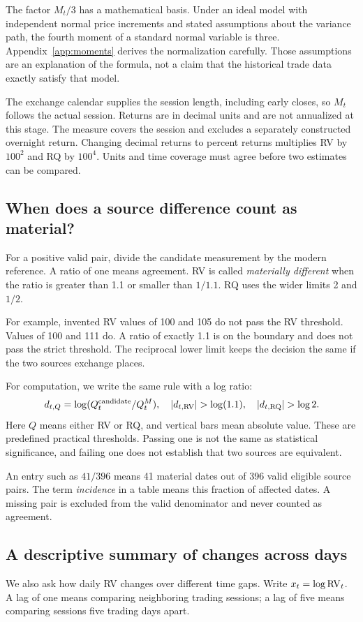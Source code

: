 The factor $M_t/3$ has a mathematical basis. Under an ideal model with independent normal price increments and stated assumptions about the variance path, the fourth moment of a standard normal variable is three. Appendix~\ref{app:moments} derives the normalization carefully. Those assumptions are an explanation of the formula, not a claim that the historical trade data exactly satisfy that model.

The exchange calendar supplies the session length, including early closes, so $M_t$ follows the actual session. Returns are in decimal units and are not annualized at this stage. The measure covers the session and excludes a separately constructed overnight return. Changing decimal returns to percent returns multiplies RV by $100^2$ and RQ by $100^4$. Units and time coverage must agree before two estimates can be compared.

\subsection{When does a source difference count as material?}
For a positive valid pair, divide the candidate measurement by the modern reference. A ratio of one means agreement. RV is called \emph{materially different} when the ratio is greater than 1.1 or smaller than $1/1.1$. RQ uses the wider limits 2 and $1/2$.

For example, invented RV values of 100 and 105 do not pass the RV threshold. Values of 100 and 111 do. A ratio of exactly 1.1 is on the boundary and does not pass the strict threshold. The reciprocal lower limit keeps the decision the same if the two sources exchange places.

For computation, we write the same rule with a log ratio:
\[
 d_{t,Q}=\log(Q_t^{\rm candidate}/Q_t^M),
 \quad |d_{t,\RV}|>\log(1.1),\quad |d_{t,\RQ}|>\log 2.
\]
Here $Q$ means either RV or RQ, and vertical bars mean absolute value. These are predefined practical thresholds. Passing one is not the same as statistical significance, and failing one does not establish that two sources are equivalent.

An entry such as $41/396$ means 41 material dates out of 396 valid eligible source pairs. The term \emph{incidence} in a table means this fraction of affected dates. A missing pair is excluded from the valid denominator and never counted as agreement.

\subsection{A descriptive summary of changes across days}
We also ask how daily RV changes over different time gaps. Write $x_t=\log\operatorname{RV}_t$. A lag of one means comparing neighboring trading sessions; a lag of five means comparing sessions five trading days apart.


